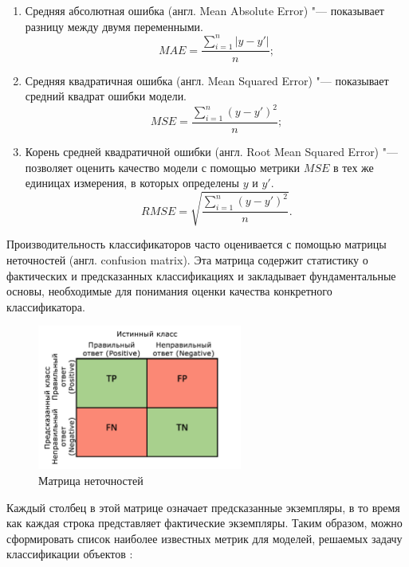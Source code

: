 \documentclass[bachelor, och, coursework]{SCWorks}
\begin{document}
        \begin{enumerate}
            \item
                Средняя абсолютная ошибка (англ. Mean Absolute Error) "---
                показывает разницу между двумя переменными.
                \[MAE = \frac{\sum_{i = 1}^n |y - y'|}{n} ;\]
            \item
                Средняя квадратичная ошибка (англ. Mean Squared Error) "---
                показывает средний квадрат ошибки модели.
                \[MSE = \frac{\sum_{i = 1}^n (y - y')^2}{n} ;\]
            \item
                Корень средней квадратичной ошибки (англ. Root Mean Squared
                Error) "--- позволяет оценить качество модели с помощью метрики
                $MSE$ в тех же единицах измерения, в которых определены $y$ и
                $y'$.
                \[RMSE = \sqrt{ \frac{\sum_{i = 1}^n (y - y')^2}{n}} .\]
        \end{enumerate}

        Производительность классификаторов часто оценивается с помощью матрицы
        неточностей (англ. confusion matrix). Эта матрица содержит статистику о
        фактических и предсказанных классификациях и закладывает фундаментальные
        основы, необходимые для понимания оценки качества конкретного
        классификатора.
        
        \begin{figure}[H]
            \centering
            \includegraphics[width=0.6\textwidth]{pics/confusion-matrix.png}
            \caption{Матрица неточностей \cite{confusionpic}}
        \end{figure}

        Каждый столбец в этой матрице означает предсказанные экземпляры, в то
        время как каждая строка представляет фактические экземпляры. Таким
        образом, можно сформировать список наиболее известных метрик для
        моделей, решаемых задачу классификации объектов \cite{metrics2}:
        
\end{document}
